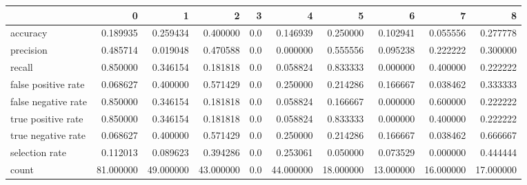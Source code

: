 \begin{tabular}{lrrrrrrrrr}
\toprule
{} &          0 &          1 &          2 &    3 &          4 &          5 &          6 &          7 &          8 \\
\midrule
accuracy            &   0.189935 &   0.259434 &   0.400000 &  0.0 &   0.146939 &   0.250000 &   0.102941 &   0.055556 &   0.277778 \\
precision           &   0.485714 &   0.019048 &   0.470588 &  0.0 &   0.000000 &   0.555556 &   0.095238 &   0.222222 &   0.300000 \\
recall              &   0.850000 &   0.346154 &   0.181818 &  0.0 &   0.058824 &   0.833333 &   0.000000 &   0.400000 &   0.222222 \\
false positive rate &   0.068627 &   0.400000 &   0.571429 &  0.0 &   0.250000 &   0.214286 &   0.166667 &   0.038462 &   0.333333 \\
false negative rate &   0.850000 &   0.346154 &   0.181818 &  0.0 &   0.058824 &   0.166667 &   0.000000 &   0.600000 &   0.222222 \\
true positive rate  &   0.850000 &   0.346154 &   0.181818 &  0.0 &   0.058824 &   0.833333 &   0.000000 &   0.400000 &   0.222222 \\
true negative rate  &   0.068627 &   0.400000 &   0.571429 &  0.0 &   0.250000 &   0.214286 &   0.166667 &   0.038462 &   0.666667 \\
selection rate      &   0.112013 &   0.089623 &   0.394286 &  0.0 &   0.253061 &   0.050000 &   0.073529 &   0.000000 &   0.444444 \\
count               &  81.000000 &  49.000000 &  43.000000 &  0.0 &  44.000000 &  18.000000 &  13.000000 &  16.000000 &  17.000000 \\
\bottomrule
\end{tabular}
